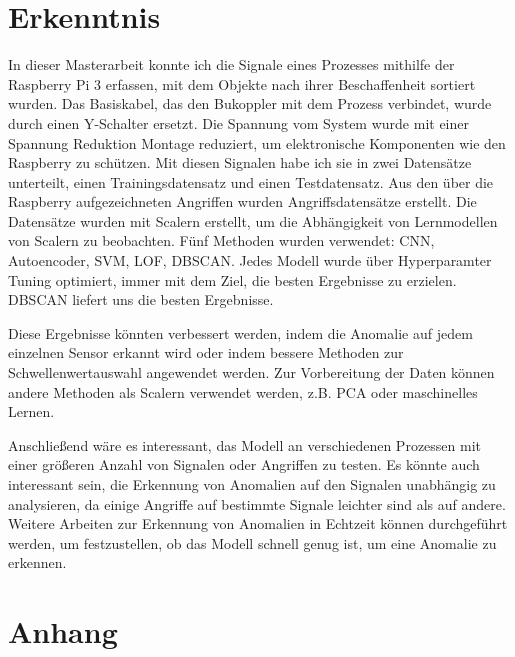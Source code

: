 \documentclass[12pt,a4paper]{scrartcl}
\numberwithin{equation}{section}
\begin{document}
 \newpage  %

\section{Erkenntnis}


In dieser Masterarbeit konnte ich die Signale eines Prozesses mithilfe der Raspberry Pi 3 erfassen, mit dem Objekte nach ihrer Beschaffenheit sortiert wurden. Das Basiskabel, das den Bukoppler mit dem Prozess verbindet, wurde durch einen Y-Schalter ersetzt. Die Spannung vom System wurde mit einer Spannung Reduktion Montage reduziert, um elektronische Komponenten wie den Raspberry zu schützen. Mit diesen Signalen habe ich sie in zwei Datensätze unterteilt, einen Trainingsdatensatz und einen Testdatensatz. Aus den über die Raspberry aufgezeichneten Angriffen wurden Angriffsdatensätze erstellt. Die Datensätze wurden mit Scalern erstellt, um die Abhängigkeit von Lernmodellen von Scalern zu beobachten. Fünf Methoden wurden verwendet: CNN, Autoencoder, SVM, LOF, DBSCAN. Jedes Modell wurde über Hyperparamter Tuning optimiert, immer mit dem Ziel, die besten Ergebnisse zu erzielen.  DBSCAN liefert uns die besten Ergebnisse.

Diese Ergebnisse könnten verbessert werden, indem die Anomalie auf jedem einzelnen Sensor erkannt wird oder indem bessere Methoden zur Schwellenwertauswahl angewendet werden. Zur Vorbereitung der Daten können andere Methoden als Scalern verwendet werden, z.B. PCA oder maschinelles Lernen.

Anschließend wäre es interessant, das Modell an verschiedenen Prozessen mit einer größeren Anzahl von Signalen oder Angriffen zu testen. Es könnte auch interessant sein, die Erkennung von Anomalien auf den Signalen unabhängig zu analysieren, da einige Angriffe auf bestimmte Signale leichter sind als auf andere. Weitere Arbeiten zur Erkennung von Anomalien in Echtzeit können durchgeführt werden, um festzustellen, ob das Modell schnell genug ist, um eine Anomalie zu erkennen.



 \newpage  %
\section*{Anhang}
\thispagestyle{plain}
\end{document}
